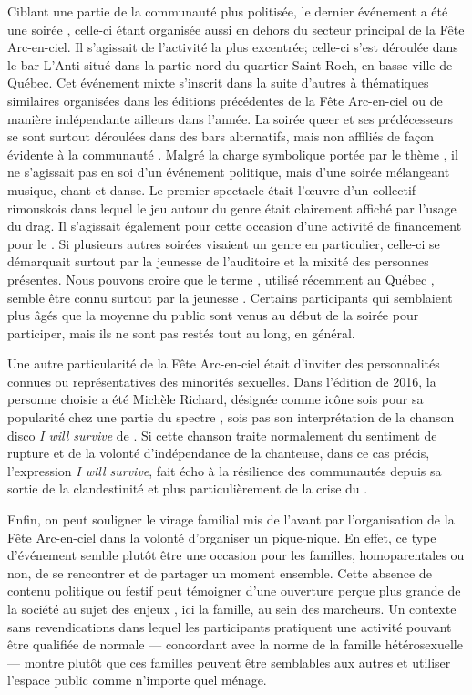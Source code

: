 Ciblant une partie de la communauté plus politisée, le dernier événement a été une soirée \qu{}, celle-ci étant organisée aussi en dehors du secteur principal de la Fête Arc-en-ciel.
Il s'agissait de l'activité la plus excentrée; celle-ci s'est déroulée dans le bar L'Anti situé dans la partie nord du quartier Saint-Roch, en basse-ville de Québec.
Cet événement mixte s'inscrit dans la suite d'autres à thématiques similaires organisées dans les éditions précédentes de la Fête Arc-en-ciel ou de manière indépendante ailleurs dans l'année.
La soirée queer et ses prédécesseurs se sont surtout déroulées dans des bars alternatifs, mais non affiliés de façon évidente à la communauté \lgbt.
Malgré la charge symbolique portée par le thème \qu, il ne s'agissait pas en soi d'un événement politique, mais d'une soirée mélangeant musique, chant et danse.
Le premier spectacle était l'œuvre d'un collectif \qu rimouskois dans lequel le jeu autour du genre était clairement affiché par l'usage du drag.
Il s'agissait également pour cette occasion d'une activité de financement pour le \ggul.
Si plusieurs autres soirées visaient un genre en particulier, celle-ci se démarquait surtout par la jeunesse de l'auditoire et la mixité des personnes présentes.
Nous pouvons croire que le terme \qu, utilisé récemment au Québec , semble être connu surtout par la jeunesse \lgbt.
Certains participants qui semblaient plus âgés que la moyenne du public sont venus au début de la soirée pour participer, mais ils ne sont pas restés tout au long, en général.

Une autre particularité de la Fête Arc-en-ciel était d'inviter des personnalités connues ou représentatives des minorités sexuelles.
Dans l'édition de 2016, la personne choisie a été Michèle Richard, désignée comme icône sois pour sa popularité chez une partie du spectre \lgbt{}, sois pas son interprétation de la chanson disco \emph{I will survive} de .
Si cette chanson traite normalement du sentiment de rupture et de la volonté d'indépendance de la chanteuse, dans ce cas précis, l'expression \emph{I will survive}, fait écho à la résilience des communautés \lgbt depuis sa sortie de la clandestinité et plus particulièrement de la crise du \vih{}.

Enfin, on peut souligner le virage familial mis de l'avant par l'organisation de la Fête Arc-en-ciel dans la volonté d'organiser un pique-nique.
En effet, ce type d'événement semble plutôt être une occasion pour les familles, homoparentales ou non, de se rencontrer et de partager un moment ensemble.
Cette absence de contenu politique ou festif peut témoigner d'une ouverture perçue plus grande de la société au sujet des enjeux \lgbt, ici la famille, au sein des marcheurs.
Un contexte sans revendications dans lequel les participants pratiquent une activité pouvant être qualifiée de normale --- concordant avec la norme de la famille hétérosexuelle --- montre plutôt que ces familles peuvent être semblables aux autres et utiliser l'espace public comme n'importe quel ménage.

